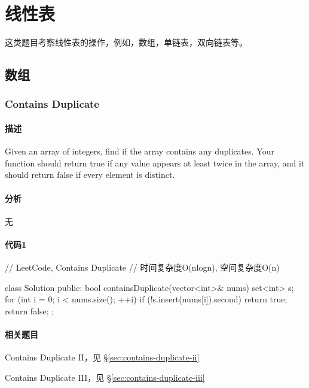 \chapter{线性表}
这类题目考察线性表的操作，例如，数组，单链表，双向链表等。


\section{数组} %

\subsection{Contains Duplicate}
\label{sec:containd-duplicate}


\subsubsection{描述}
Given an array of integers, find if the array contains any duplicates. Your function should return true if any value appears at least twice in the array, and it should return false if every element is distinct.

\subsubsection{分析}
无


\subsubsection{代码1}
\begin{Code}
// LeetCode, Contains Duplicate
// 时间复杂度O(nlogn), 空间复杂度O(n)

class Solution {
    public:
    bool containsDuplicate(vector<int>& nums) {
        set<int> s;
        for (int i = 0; i < nums.size(); ++i) {
            if (!s.insert(nums[i]).second)
            return true;
        }
        return false;
    }
};

\end{Code}


\subsubsection{相关题目}

\begindot
\item Contains Duplicate II，见 \S \ref{sec:contains-duplicate-ii}
\item Contains Duplicate III，见 \S \ref{sec:contains-duplicate-iii}
\myenddot


